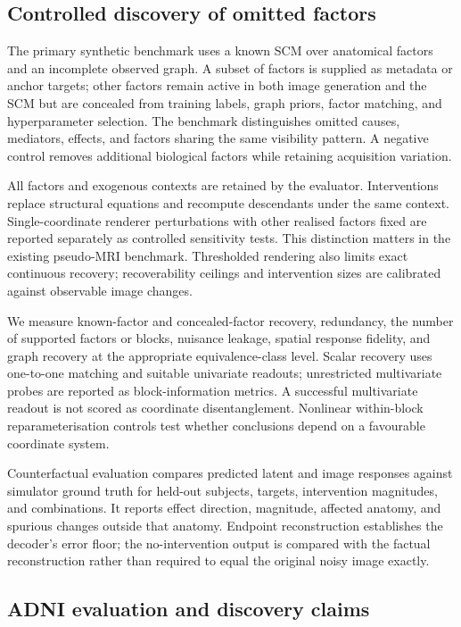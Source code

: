 \documentclass[10pt,twocolumn,letterpaper]{article}
\begin{document}
\subsection{Controlled discovery of omitted factors}

The primary synthetic benchmark uses a known SCM over anatomical factors and an incomplete observed graph. A subset of factors is supplied as metadata or anchor targets; other factors remain active in both image generation and the SCM but are concealed from training labels, graph priors, factor matching, and hyperparameter selection. The benchmark distinguishes omitted causes, mediators, effects, and factors sharing the same visibility pattern. A negative control removes additional biological factors while retaining acquisition variation.

All factors and exogenous contexts are retained by the evaluator. Interventions replace structural equations and recompute descendants under the same context. Single-coordinate renderer perturbations with other realised factors fixed are reported separately as controlled sensitivity tests. This distinction matters in the existing pseudo-MRI benchmark. Thresholded rendering also limits exact continuous recovery; recoverability ceilings and intervention sizes are calibrated against observable image changes.

We measure known-factor and concealed-factor recovery, redundancy, the number of supported factors or blocks, nuisance leakage, spatial response fidelity, and graph recovery at the appropriate equivalence-class level. Scalar recovery uses one-to-one matching and suitable univariate readouts; unrestricted multivariate probes are reported as block-information metrics. A successful multivariate readout is not scored as coordinate disentanglement. Nonlinear within-block reparameterisation controls test whether conclusions depend on a favourable coordinate system.

Counterfactual evaluation compares predicted latent and image responses against simulator ground truth for held-out subjects, targets, intervention magnitudes, and combinations. It reports effect direction, magnitude, affected anatomy, and spurious changes outside that anatomy. Endpoint reconstruction establishes the decoder's error floor; the no-intervention output is compared with the factual reconstruction rather than required to equal the original noisy image exactly.

\subsection{ADNI evaluation and discovery claims}
\end{document}
